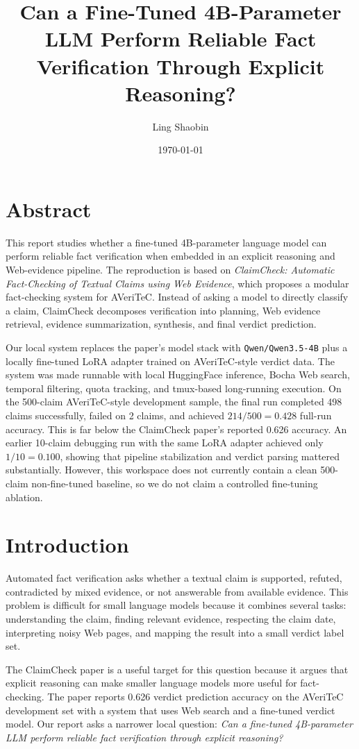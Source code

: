 \documentclass[11pt]{article}
\title{Can a Fine-Tuned 4B-Parameter LLM Perform Reliable Fact Verification Through Explicit Reasoning?}
\author{Ling Shaobin}
\date{\today}
\begin{document}
\maketitle

\section*{Abstract}
This report studies whether a fine-tuned 4B-parameter language model can perform reliable fact verification when embedded in an explicit reasoning and Web-evidence pipeline. The reproduction is based on \textit{ClaimCheck: Automatic Fact-Checking of Textual Claims using Web Evidence}, which proposes a modular fact-checking system for AVeriTeC. Instead of asking a model to directly classify a claim, ClaimCheck decomposes verification into planning, Web evidence retrieval, evidence summarization, synthesis, and final verdict prediction.

Our local system replaces the paper's model stack with \texttt{Qwen/Qwen3.5-4B} plus a locally fine-tuned LoRA adapter trained on AVeriTeC-style verdict data. The system was made runnable with local HuggingFace inference, Bocha Web search, temporal filtering, quota tracking, and tmux-based long-running execution. On the 500-claim AVeriTeC-style development sample, the final run completed 498 claims successfully, failed on 2 claims, and achieved \(214/500 = 0.428\) full-run accuracy. This is far below the ClaimCheck paper's reported 0.626 accuracy. An earlier 10-claim debugging run with the same LoRA adapter achieved only \(1/10 = 0.100\), showing that pipeline stabilization and verdict parsing mattered substantially. However, this workspace does not currently contain a clean 500-claim non-fine-tuned baseline, so we do not claim a controlled fine-tuning ablation.

\section*{Introduction}
Automated fact verification asks whether a textual claim is supported, refuted, contradicted by mixed evidence, or not answerable from available evidence. This problem is difficult for small language models because it combines several tasks: understanding the claim, finding relevant evidence, respecting the claim date, interpreting noisy Web pages, and mapping the result into a small verdict label set.

The ClaimCheck paper is a useful target for this question because it argues that explicit reasoning can make smaller language models more useful for fact-checking. The paper reports 0.626 verdict prediction accuracy on the AVeriTeC development set with a system that uses Web search and a fine-tuned verdict model. Our report asks a narrower local question: \textit{Can a fine-tuned 4B-parameter LLM perform reliable fact verification through explicit reasoning?}
\end{document}
